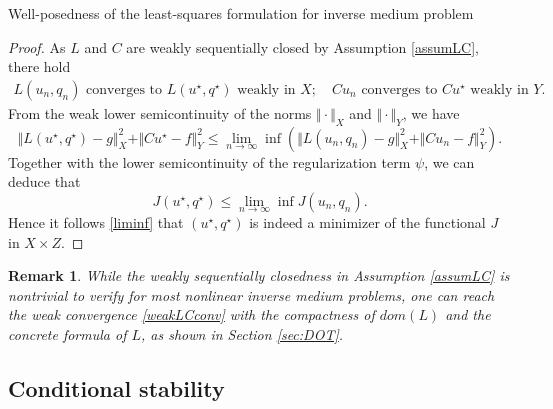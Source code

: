 \documentclass[11pt]{article}%
\renewcommand{\_}{{\fontfamily{ptm}\selectfont\textunderscore}}
\theoremstyle{plain}
\numberwithin{equation}{section}
\newtheorem{remark}{Remark}
\def\rt{\right} \def\lt{\left}
\begin{document}
\begin{section}{Well-posedness of the least-squares formulation for inverse medium problem}
\begin{proof}
 As $L$ and $C$ are weakly sequentially closed by Assumption \ref{assumLC}, there hold
\begin{eqnarray}
L(u_n,q_n)\text{ converges to } L(u^\star, q^\star)\text{ weakly in }X; \quad Cu_n \text{ converges to } Cu^\star \text{ weakly in }Y.\label{weakLCconv}
\end{eqnarray}
From the weak lower semicontinuity of the norms $\Vert\cdot\Vert_X$ and $\Vert\cdot\Vert_Y$, we have 
$$\Vert L(u^\star,q^\star)-g\Vert^2_X+ \Vert Cu^\star -f\Vert^2_Y\leq \lim_{n\to\infty}\inf\lt(\Vert L(u_n, q_n)-g\Vert^2_X+ \Vert Cu_n-f\Vert^2_Y\rt).$$
 Together with the lower semicontinuity of the regularization term $\psi$, we can deduce that
 \begin{equation*}
 J(u^\star, q^\star)\leq \lim_{n\to\infty}\inf J(u_n, q_n).
 \end{equation*}
Hence it follows \eqref{liminf} that $(u^\star,q^\star)$ is indeed a minimizer of the functional $J$ in $X\times Z$.
\end{proof}

\begin{remark}\label{rmkweakclose}
While the weakly sequentially closedness in Assumption \ref{assumLC} is
nontrivial to verify for most nonlinear inverse medium problems, one can reach the weak convergence \eqref{weakLCconv} with the compactness of $dom(L)$ and the concrete formula of $L$, as shown in Section \ref{sec:DOT}.
\end{remark}


\subsection{Conditional stability}


\end{section}
\end{document}
